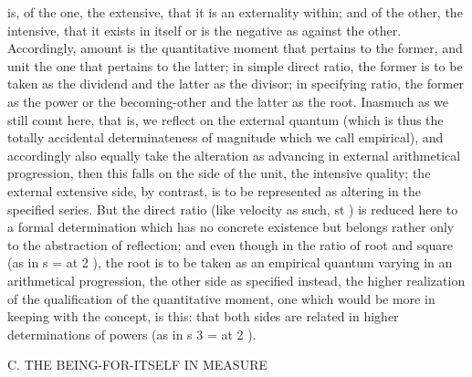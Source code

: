 is, of the one, the extensive, that it is an externality within; and of the
other, the intensive, that it exists in itself or is the negative as against the
other. Accordingly, amount is the quantitative moment that pertains to the
former, and unit the one that pertains to the latter; in simple direct ratio,
the former is to be taken as the dividend and the latter as the divisor; in
specifying ratio, the former as the power or the becoming-other and the
latter as the root. Inasmuch as we still count here, that is, we reflect on the
external quantum (which is thus the totally accidental determinateness of
magnitude which we call empirical), and accordingly also equally take the
alteration as advancing in external arithmetical progression, then this falls
on the side of the unit, the intensive quality; the external extensive side, by
contrast, is to be represented as altering in the specified series. But the direct
ratio (like velocity as such, st ) is reduced here to a formal determination
which has no concrete existence but belongs rather only to the abstraction
of reflection; and even though in the ratio of root and square (as in s = at 2 ),
the root is to be taken as an empirical quantum varying in an arithmetical
progression, the other side as specified instead, the higher realization of
the qualification of the quantitative moment, one which would be more
in keeping with the concept, is this: that both sides are related in higher
determinations of powers (as in s 3 = at 2 ).

C. THE BEING-FOR-ITSELF IN MEASURE

